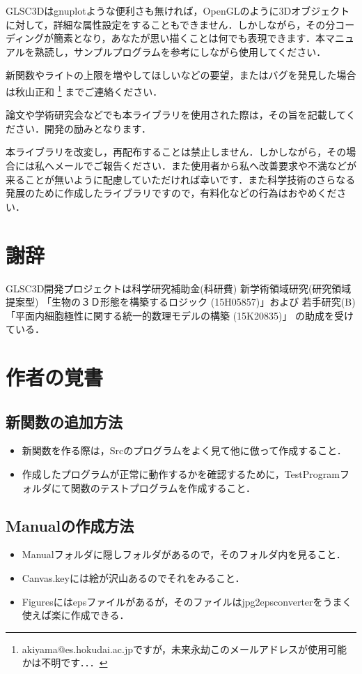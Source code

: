 \documentclass[platex,a4paper,12pt]{jsarticle}%
\begin{document}
GLSC3Dはgnuplotような便利さも無ければ，OpenGLのように3Dオブジェクトに対して，詳細な属性設定をすることもできません．しかしながら，その分コーディングが簡素となり，あなたが思い描くことは何でも表現できます．本マニュアルを熟読し，サンプルプログラムを参考にしながら使用してください．

新関数やライトの上限を増やしてほしいなどの要望，またはバグを発見した場合は秋山正和
\footnote{akiyama@es.hokudai.ac.jpですが，未来永劫このメールアドレスが使用可能かは不明です．．．}
までご連絡ください．

論文や学術研究会などでも本ライブラリを使用された際は，その旨を記載してください．開発の励みとなります．

本ライブラリを改変し，再配布することは禁止しません．しかしながら，その場合には私へメールでご報告ください．また使用者から私へ改善要求や不満などが来ることが無いように配慮していただければ幸いです．また科学技術のさらなる発展のために作成したライブラリですので，有料化などの行為はおやめください．

\section{謝辞}
GLSC3D開発プロジェクトは科学研究補助金(科研費) 	
新学術領域研究(研究領域提案型) 「生物の３Ｄ形態を構築するロジック (15H05857)」および
若手研究(B)「平面内細胞極性に関する統一的数理モデルの構築 (15K20835)」
の助成を受けている．

\newpage
\section{作者の覚書}

\subsection{新関数の追加方法}
\begin{itemize}
 \item 新関数を作る際は，Srcのプログラムをよく見て他に倣って作成すること．
 \item 作成したプログラムが正常に動作するかを確認するために，TestProgramフォルダにて関数のテストプログラムを作成すること．
\end{itemize}

\subsection{Manualの作成方法}
\begin{itemize}
 \item Manualフォルダに隠しフォルダがあるので，そのフォルダ内を見ること．
 \item Canvas.keyには絵が沢山あるのでそれをみること．
 \item Figuresにはepsファイルがあるが，そのファイルはjpg2epsconverterをうまく使えば楽に作成できる．
\end{itemize}
\end{document}
